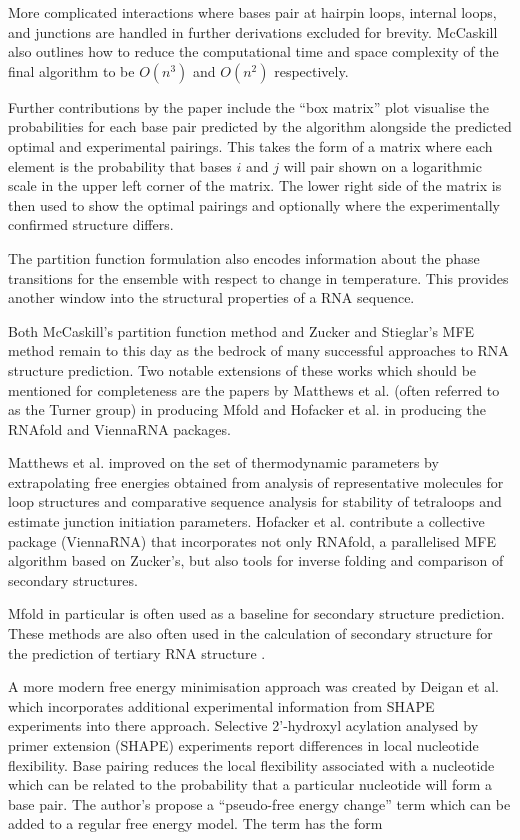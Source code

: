 \documentclass[journal]{IEEEtran}
\begin{document}
More complicated interactions where bases pair at hairpin loops, internal loops, and junctions are handled in further derivations excluded for brevity. McCaskill also outlines how to reduce the computational time and space complexity of the final algorithm to be $O(n^3)$ and $O(n^2)$ respectively.

Further contributions by the paper include the ``box matrix'' plot visualise the probabilities for each base pair predicted by the algorithm alongside the predicted optimal and experimental pairings. This takes the form of a matrix where each element is the probability that bases $i$ and $j$ will pair shown on a logarithmic scale in the upper left corner of the matrix. The lower right side of the matrix is then used to show the optimal pairings and optionally where the experimentally confirmed structure differs. 

The partition function formulation also encodes information about the phase transitions for the ensemble with respect to change in temperature. This provides another window into the structural properties of a RNA sequence.

Both McCaskill's partition function method and Zucker and Stieglar's MFE method remain to this day as the bedrock of many successful approaches to RNA structure prediction. Two notable extensions of these works which should be mentioned for completeness are the papers by Matthews et al. \cite{mathews1999expanded} (often referred to as the Turner group) in producing Mfold and Hofacker et al. \cite{hofacker1994fast} in producing the RNAfold and ViennaRNA packages. 

Matthews et al. improved on the set of thermodynamic parameters by extrapolating free energies obtained from analysis of representative molecules for loop structures and comparative sequence analysis for stability of tetraloops and estimate junction initiation parameters. Hofacker et al. contribute a collective package (ViennaRNA) that incorporates not only RNAfold, a parallelised MFE algorithm based on Zucker's, but also tools for inverse folding and comparison of secondary structures. 

Mfold in particular is often used as a baseline for secondary structure prediction. These methods are also often used in the calculation of secondary structure for the prediction of tertiary RNA structure \cite{laing2010computational, cruz2012rna, miao2015rna}.

A more modern free energy minimisation approach was created by Deigan et al. \cite{deigan2009accurate} which incorporates additional experimental information from SHAPE experiments into there approach. Selective 2'-hydroxyl acylation analysed by primer extension (SHAPE) experiments report differences in local nucleotide flexibility. Base pairing reduces the local flexibility associated with a nucleotide which can be related to the probability that a particular nucleotide will form a base pair. The author's propose a ``pseudo-free energy change'' term which can be added to a regular free energy model. The term has the form
\end{document}
